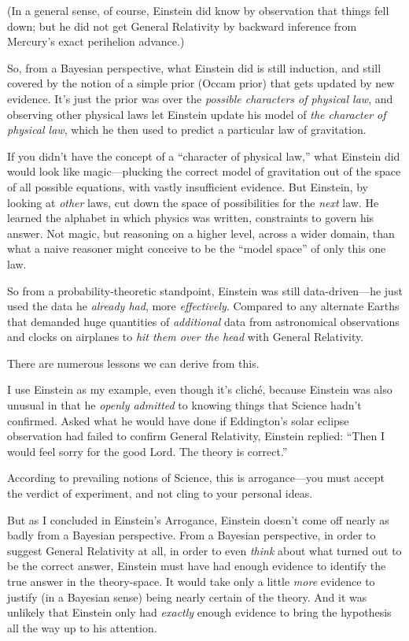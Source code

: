 {
 (In a general sense, of course, Einstein did know by observation
that things fell down; but he did not get General Relativity by
backward inference from Mercury's exact perihelion
advance.)}

{
 So, from a Bayesian perspective, what Einstein did is still
induction, and still covered by the notion of a simple prior (Occam
prior) that gets updated by new evidence. It's just the
prior was over the \textit{possible characters of physical law}, and
observing other physical laws let Einstein update his model of
\textit{the character of physical law}, which he then used to predict a
particular law of gravitation.}

{
 If you didn't have the concept of a
``character of physical law,'' what
Einstein did would look like magic---plucking the correct model of
gravitation out of the space of all possible equations, with vastly
insufficient evidence. But Einstein, by looking at \textit{other} laws,
cut down the space of possibilities for the \textit{next} law. He
learned the alphabet in which physics was written, constraints to
govern his answer. Not magic, but reasoning on a higher level, across a
wider domain, than what a naive reasoner might conceive to be the
``model space'' of only this one
law.}

{
 So from a probability-theoretic standpoint, Einstein was still
data-driven---he just used the data he \textit{already had}, more
\textit{effectively}. Compared to any alternate Earths that demanded
huge quantities of \textit{additional} data from astronomical
observations and clocks on airplanes to \textit{hit them over the head}
with General Relativity.}

{
 There are numerous lessons we can derive from this.}

{
 I use Einstein as my example, even though it's
cliché, because Einstein was also unusual in that he \textit{openly
admitted} to knowing things that Science hadn't
confirmed. Asked what he would have done if Eddington's
solar eclipse observation had failed to confirm General Relativity,
Einstein replied: ``Then I would feel sorry for the
good Lord. The theory is correct.''}

{
 According to prevailing notions of Science, this is
arrogance---you must accept the verdict of experiment, and not cling to
your personal ideas.}

{
 But as I concluded in Einstein's Arrogance,
Einstein doesn't come off nearly as badly from a
Bayesian perspective. From a Bayesian perspective, in order to suggest
General Relativity at all, in order to even \textit{think} about what
turned out to be the correct answer, Einstein must have had enough
evidence to identify the true answer in the theory-space. It would take
only a little \textit{more} evidence to justify (in a Bayesian sense)
being nearly certain of the theory. And it was unlikely that Einstein
only had \textit{exactly} enough evidence to bring the hypothesis all
the way up to his attention.}

